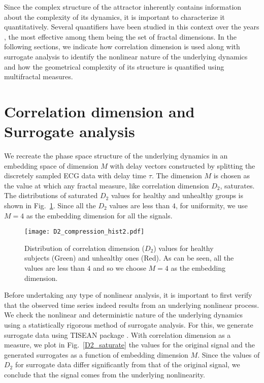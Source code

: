 \documentclass[9pt,twocolumn,twoside]{pnas-new}
\begin{document}
Since the complex structure of the attractor inherently contains information about the complexity of its dynamics, it is important to characterize it quantitatively. Several quantifiers have been studied in this context over the years \cite{paladin1986intermittency}, the most effective among them being the set of fractal dimensions. In the following sections, we indicate how correlation dimension is used along with surrogate analysis to identify the nonlinear nature of the underlying dynamics and how the geometrical complexity of its structure is quantified using multifractal measures.

\section{Correlation dimension and Surrogate analysis}
We recreate the phase space structure of the underlying dynamics in an embedding space of dimension $M$ with delay vectors constructed by splitting the discretely sampled ECG data with delay time $\tau$. The dimension $M$ is chosen as the value at which any fractal measure, like correlation dimension $D_2$, saturates. The distributions of saturated $D_2$ values for healthy and unhealthy groups is shown in Fig.~\ref{D2}. Since all the $D_2$ values are less than $4$, for uniformity, we use $M = 4$ as the embedding dimension for all the signals. 

\begin{figure}[h]
\texttt{[image: D2\_compression\_hist2.pdf]}
\caption{\label{D2} Distribution of correlation dimension ($D_2$) values for healthy subjects (Green) and unhealthy ones (Red). As can be seen, all the values are less than $4$ and so we choose $M = 4$ as the embedding dimension.}
\end{figure}

Before undertaking any type of nonlinear analysis, it is important to first verify that the observed time series indeed results from an underlying nonlinear process. We check the nonlinear and deterministic nature of the underlying dynamics using a statistically rigorous method of surrogate analysis\cite{theiler1992testing, schreiber2000surrogate}. For this, we generate surrogate data using TISEAN package \cite{hegger1999practical}. With correlation dimension as a measure, we plot in Fig.~\ref{D2_saturate} the values for the original signal and the generated surrogates as a function of embedding dimension $M$. Since the values of $D_2$ for surrogate data differ significantly from that of the original signal, we conclude that the signal comes from the underlying nonlinearity.
\end{document}

